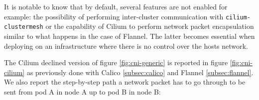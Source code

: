 It is notable to know that by default, several features are not enabled for
example: the possibility of performing inter-cluster communication with
\texttt{cilium-clustermesh} or the capability of Cilium to perform network
packet encapsulation similar to what happens in the case of Flannel. The latter
becomes essential when deploying on an infrastructure where there is no control
over the hosts network.


The Cilium declined version of figure \ref{fig:cni-generic} is reported in
figure \ref{fig:cni-cilium} as previously done with Calico \ref{subsec:calico}
and Flannel \ref{subsec:flannel}. We also report the step-by-step path a network
packet has to go through to be sent from pod A in node A up to pod B in node B:


